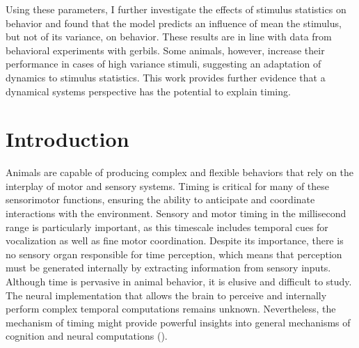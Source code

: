 \documentclass[10pt]{article}
\begin{document}
Using these parameters, I further investigate the effects of stimulus statistics on behavior and found that the model predicts an influence of mean the stimulus, but not of its variance, on behavior.
These results are in line with data from behavioral experiments with gerbils. Some animals, however, increase their performance in cases of high variance stimuli, suggesting an adaptation of dynamics to stimulus statistics.
This work provides further evidence that a dynamical systems perspective has the potential to explain timing.



\pagebreak

\tableofcontents

\pagebreak

\section{Introduction}
Animals are capable of producing complex and flexible behaviors that rely on the interplay of motor and sensory systems.
Timing is critical for many of these sensorimotor functions, ensuring the ability to anticipate and coordinate interactions with the environment.
Sensory and motor timing in the millisecond range is particularly important, as this timescale includes temporal cues for vocalization as well as fine motor coordination.
Despite its importance, there is no sensory organ responsible for time perception, which means that perception must be generated internally by extracting information from sensory inputs.
Although time is pervasive in animal behavior, it is elusive and difficult to study. The neural implementation that allows the brain to perceive and internally perform complex temporal computations remains unknown.
Nevertheless, the mechanism of timing might provide powerful insights into general mechanisms of cognition and neural computations (\cite{Issa2020}).
\end{document}
